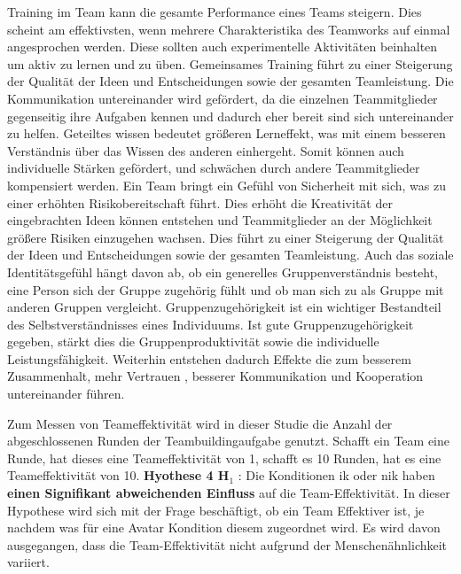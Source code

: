 \documentclass[a4paper,11pt]{article}%
\renewcommand{\\}{\vspace*{0.5\baselineskip} \newline}
\begin{document}
	Training im Team kann die gesamte Performance eines Teams steigern. Dies scheint am effektivsten, wenn mehrere Charakteristika des Teamworks auf einmal angesprochen werden. Diese sollten auch experimentelle Aktivitäten beinhalten um aktiv zu lernen und zu üben. \citep[19]{mcewan2017effectiveness}
Gemeinsames Training führt zu einer Steigerung der Qualität der Ideen und Entscheidungen sowie der gesamten Teamleistung.
	Die Kommunikation untereinander wird gefördert, da die einzelnen Teammitglieder gegenseitig ihre Aufgaben kennen und dadurch eher bereit sind sich untereinander zu helfen.
	Geteiltes wissen bedeutet größeren Lerneffekt, was mit einem besseren Verständnis über das Wissen des anderen einhergeht. Somit können auch individuelle Stärken gefördert, und schwächen durch andere Teammitglieder kompensiert werden.
	Ein Team bringt ein Gefühl von Sicherheit mit sich, was zu einer erhöhten Risikobereitschaft führt. Dies erhöht die Kreativität der eingebrachten Ideen können entstehen und Teammitglieder an der Möglichkeit größere Risiken einzugehen wachsen. \citep[p. 2-4]{biech2007pfeiffer}
	Dies führt zu einer Steigerung der Qualität der Ideen und Entscheidungen sowie der gesamten Teamleistung.
Auch das soziale Identitätsgefühl hängt davon ab, ob ein generelles Gruppenverständnis besteht, eine Person sich der Gruppe zugehörig fühlt und ob man sich zu als Gruppe mit anderen Gruppen vergleicht. Gruppenzugehörigkeit ist ein wichtiger Bestandteil des Selbstverständnisses eines Individuums. \citep{sutantovicious}
		Ist gute Gruppenzugehörigkeit gegeben, stärkt dies die Gruppenproduktivität sowie die individuelle Leistungsfähigkeit. Weiterhin entstehen dadurch Effekte die zum besserem Zusammenhalt, mehr Vertrauen \citep{herbsleb2000distance}, besserer Kommunikation und Kooperation untereinander führen. \citep[p. 510]{olson2003psychological}
		
Zum Messen von Teameffektivität wird in dieser Studie die Anzahl der abgeschlossenen Runden der Teambuildingaufgabe genutzt. Schafft ein Team eine Runde, hat dieses eine Teameffektivität von 1, schafft es 10 Runden, hat es eine Teameffektivität von 10.
\\
\textbf{Hyothese 4 H$_{1}$} : Die Konditionen \ac{ik} oder \ac{nik} haben \textbf{einen Signifikant abweichenden Einfluss} auf die Team-Effektivität.
\\
In dieser Hypothese wird sich mit der Frage beschäftigt, ob ein Team Effektiver ist, je nachdem was für eine Avatar Kondition diesem zugeordnet wird. Es wird davon ausgegangen, dass die Team-Effektivität nicht aufgrund der Menschenähnlichkeit variiert.
\end{document}
